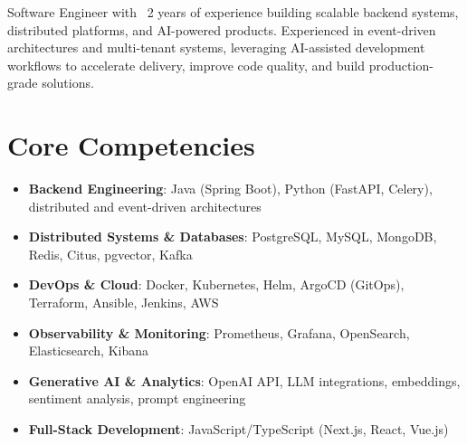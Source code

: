 \documentclass[11pt,a4paper,sans]{moderncv}
\begin{document}
\makecvtitle


\vspace{6pt}
\small{Software Engineer with ~2 years of experience building scalable backend systems, distributed platforms, and AI-powered products. Experienced in event-driven architectures and multi-tenant systems, leveraging AI-assisted development workflows to accelerate delivery, improve code quality, and build production-grade solutions.}


\section{Core Competencies}
\vspace{1pt}
\begin{itemize}

\item \textbf{Backend Engineering}: Java (Spring Boot), Python (FastAPI, Celery), distributed and event-driven architectures

\item \textbf{Distributed Systems \& Databases}: PostgreSQL, MySQL, MongoDB, Redis, Citus, pgvector, Kafka

\item \textbf{DevOps \& Cloud}: Docker, Kubernetes, Helm, ArgoCD (GitOps), Terraform, Ansible, Jenkins, AWS

\item \textbf{Observability \& Monitoring}: Prometheus, Grafana, OpenSearch, Elasticsearch, Kibana

\item \textbf{Generative AI \& Analytics}: OpenAI API, LLM integrations, embeddings, sentiment analysis, prompt engineering

\item \textbf{Full-Stack Development}: JavaScript/TypeScript (Next.js, React, Vue.js)

\end{itemize}

\end{document}
